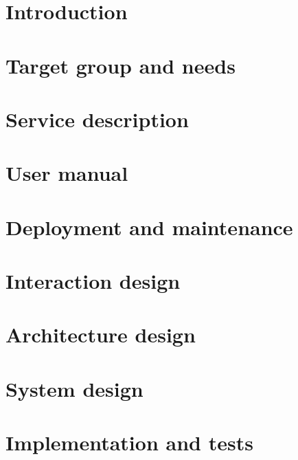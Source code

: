 \documentclass[a4paper,twoside]{report}
\begin{document}
\setcounter{secnumdepth}{5}

\setlength{\parindent}{0pt}
\setlength{\parskip}{10pt}

\graphicspath{ {figures/} }

\tableofcontents

\chapter{Introduction}


\chapter{Target group and needs}


\chapter{Service description}


\chapter{User manual}


\chapter{Deployment and maintenance}


\chapter{Interaction design}


\chapter{Architecture design}


\chapter{System design}


\chapter{Implementation and tests}




\end{document}
